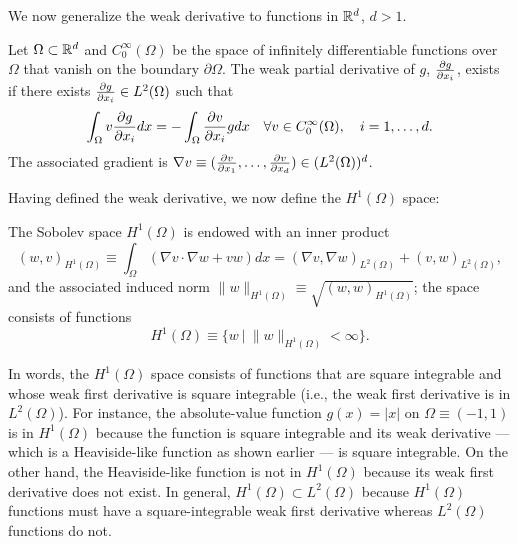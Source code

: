 
We now generalize the weak derivative to functions in $\mathbb{R}^d$, $d > 1$.
\begin{definition}
  Let $\Omega \subset \mathbb{R}^d$ and $C_0^\infty(\Omega)$ be the space of infinitely differentiable functions over $\Omega$ that vanish on the boundary $\partial \Omega$. The weak partial derivative of $g$, $\frac{\partial g}{\partial x_i}$, exists if there exists $\frac{\partial g}{\partial x_i} \in L^2(\Omega)$ such that
  \begin{equation*}
    \int_\Omega v \frac{\partial g}{\partial x_i} dx = - \int_\Omega \frac{\partial v}{\partial x_i} g dx \quad \forall v \in C_0^\infty(\Omega), \quad i = 1,\dots, d.
  \end{equation*}
  The associated gradient is $\nabla v \equiv (\frac{\partial v}{\partial x_1}, \dots, \frac{\partial v}{\partial x_d}) \in (L^2(\Omega))^d$.
\end{definition}
Having defined the weak derivative, we now define the $H^1(\Omega)$ space:
\begin{definition}
  The Sobolev space $H^1(\Omega)$ is endowed with an inner product
  \begin{equation*}
    (w,v)_{H^1(\Omega)} \equiv \int_{\Omega} (\nabla v \cdot \nabla w + v w) dx
    = (\nabla v, \nabla w)_{L^2(\Omega)} + (v,w)_{L^2(\Omega)},
  \end{equation*}
  and the associated induced norm $\| w \|_{H^1(\Omega)} \equiv \sqrt{(w,w)_{H^1(\Omega)}}$; the space consists of functions
  \begin{equation*}
    H^1(\Omega) \equiv \{ w \ | \ \| w \|_{H^1(\Omega)} < \infty \}.
  \end{equation*}
\end{definition}
In words, the $H^1(\Omega)$ space consists of functions that are square integrable and whose weak first derivative is square integrable (i.e., the weak first derivative is in $L^2(\Omega)$).    For instance, the absolute-value function $g(x) = |x|$ on $\Omega \equiv (-1,1)$ is in $H^1(\Omega)$ because the function is square integrable and its weak derivative --- which is a Heaviside-like function as shown earlier --- is square integrable. On the other hand, the Heaviside-like function is not in $H^1(\Omega)$ because its weak first derivative does not exist. In general, $H^1(\Omega) \subset L^2(\Omega)$ because $H^1(\Omega)$ functions must have a square-integrable weak first derivative whereas $L^2(\Omega)$ functions do not.

